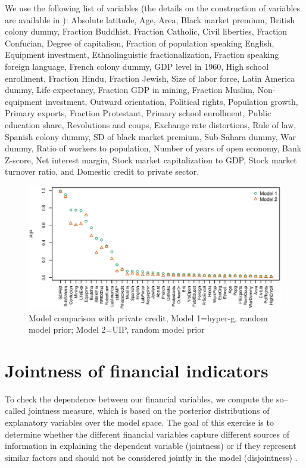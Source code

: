 \begin{refsection}
\begin{subappendices}
We use the following list of variables (the details on the construction of variables are available in \textcite{Fernandezetal2001}): Absolute latitude, Age, Area, Black market premium, British colony dummy, Fraction Buddhist, Fraction Catholic, Civil liberties, Fraction Confucian, Degree of capitalism, Fraction of population speaking English, Equipment investment, Ethnolinguistic fractionalization, Fraction speaking foreign language, French colony dummy, GDP level in 1960, High school enrollment, Fraction Hindu, Fraction Jewish, Size of labor force, Latin America dummy, Life expectancy, Fraction GDP in mining, Fraction Muslim, Non-equipment investment, Outward orientation, Political rights, Population growth, Primary exports, Fraction Protestant, Primary school enrollment, Public education share, Revolutions and coups, Exchange rate distortions, Rule of law, Spanish colony dummy, SD of black market premium, Sub-Sahara dummy, War dummy, Ratio of workers to population, Number of years of open economy, Bank Z-score, Net interest margin, Stock market capitalization to GDP, Stock market turnover ratio, and Domestic credit to private sector.

\begin{figure}[!ht]
	\begin{center}
		\includegraphics[width=\linewidth]{Figures/ch2/plotCompPC6011rnd}
		\caption{Model comparison with private credit, Model 1=hyper-g, random model prior; Model 2=\ac{UIP}, random model prior}
		\label{ch2fig:compPCrnd}
	\end{center}
\end{figure}
%

\section{Jointness of financial indicators}\label{ch2app:joint}
To check the dependence between our financial variables, we compute the so--called jointness measure, which is based on the posterior distributions of explanatory variables over the model space. The goal of this exercise is to determine whether the different financial variables capture different sources of information in explaining the dependent variable (jointness) or if they represent similar factors and should not be considered jointly in the model (disjointness) \parencite{leysteel2007}.


\end{subappendices}
\end{refsection}
